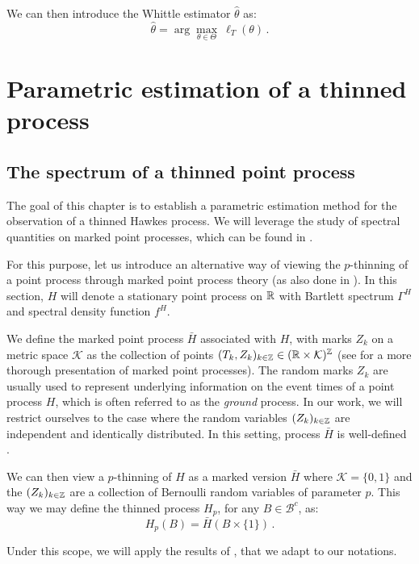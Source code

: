 We can then introduce the Whittle estimator $\hat \theta$ \parencite{Whittle1952} as:
\[\hat \theta = \arg\max_{\theta \in \Theta}~ \ell_T (\theta)\,.\]

\section{Parametric estimation of a thinned process}\label{sec:chap5_estimation}

    \subsection{The spectrum of a thinned point process}\label{sec:chap5_thinned_spectrum}

The goal of this chapter is to establish a parametric estimation method for the observation of a thinned Hawkes process.
We will leverage the study of spectral quantities on marked point processes, 
which can be found in \textcite{Bremaud2002, Bremaud2005}. 

For this purpose, let us introduce an alternative way of viewing the $p$-thinning of a point process through marked point process theory (as also done in \textcite{Cronie2024}).
In this section, $H$ will denote a stationary point process on ${\mathbb R}$ with Bartlett spectrum $\Gamma^H$ and spectral density function $f^H$.

We define the marked point process $\bar H$ associated with $H$, with marks $Z_k$ on a metric space $\mathcal{K}$ as the collection of points
$(T_k, Z_k)_{k\in{\mathbb Z}} \in ({\mathbb R} \times \mathcal{K})^{{\mathbb Z}}$ (see \textcite[Chapter 6.4]{DaleyV1} for a more thorough presentation of marked point processes). 
The random marks $Z_k$ are usually used to represent underlying information on the event times of a point process $H$, 
which is often referred to as the \textit{ground} process.
In our work, we will restrict ourselves to the case where the random variables $(Z_k)_{k\in{\mathbb Z}}$ are independent and identically distributed.
In this setting, process $\bar H$ is well-defined \parencite[6.4.IV(a)]{DaleyV1}.

We can then view a $p$-thinning of $H$ as a marked version $\bar H$ where $\mathcal{K} = \{0,1\}$
and the $(Z_k)_{k\in{\mathbb Z}}$ are a collection of Bernoulli random variables of parameter $p$.
This way we may define the thinned process $H_p$, for any $B\in\mathcal{B}^c$, as:
\[H_p(B) = \bar H(B\times\{1\})\,.\]

Under this scope, we will apply the results of \textcite{Bremaud2005}, 
that we adapt to our notations.

